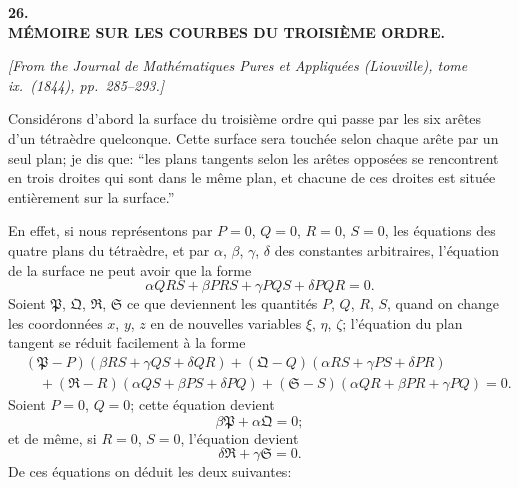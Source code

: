 \documentclass[12pt,a4paper]{article}
\providecommand{\fS}{\mathfrak{S}}
\providecommand{\fP}{\mathfrak{P}}
\providecommand{\fQ}{\mathfrak{Q}}
\providecommand{\fR}{\mathfrak{R}}
\begin{document}
\newpage
\setcounter{page}{183}

\begin{center}
\textbf{\Large 26.}\\[1em]
\textbf{\Large M\'EMOIRE SUR LES COURBES DU TROISI\`EME ORDRE.}
\end{center}

\textit{[From the Journal de Math\'ematiques Pures et Appliqu\'ees (Liouville), tome ix.~(1844), pp.~285--293.]}

\bigskip

Consid\'erons d'abord la surface du troisi\`eme ordre qui passe par les six ar\^etes d'un t\'etra\`edre quelconque. Cette surface sera touch\'ee selon chaque ar\^ete par un seul plan; je dis que: ``les plans tangents selon les ar\^etes oppos\'ees se rencontrent en trois droites qui sont dans le m\^eme plan, et chacune de ces droites est situ\'ee enti\`erement sur la surface.''

En effet, si nous repr\'esentons par $P = 0$, $Q = 0$, $R = 0$, $S = 0$, les \'equations des quatre plans du t\'etra\`edre, et par $\alpha$, $\beta$, $\gamma$, $\delta$ des constantes arbitraires, l'\'equation de la surface ne peut avoir que la forme
\[
\alpha QRS + \beta PRS + \gamma PQS + \delta PQR = 0.
\]
Soient $\fP$, $\fQ$, $\fR$, $\fS$ ce que deviennent les quantit\'es $P$, $Q$, $R$, $S$, quand on change les coordonn\'ees $x$, $y$, $z$ en de nouvelles variables $\xi$, $\eta$, $\zeta$; l'\'equation du plan tangent se r\'eduit facilement \`a la forme
\begin{align*}
&(\fP - P)(\beta RS + \gamma QS + \delta QR) + (\fQ - Q)(\alpha RS + \gamma PS + \delta PR)\\
&\quad + (\fR - R)(\alpha QS + \beta PS + \delta PQ) + (\fS - S)(\alpha QR + \beta PR + \gamma PQ) = 0.
\end{align*}
Soient $P = 0$, $Q = 0$; cette \'equation devient
\[
\beta\fP + \alpha\fQ = 0;
\]
et de m\^eme, si $R = 0$, $S = 0$, l'\'equation devient
\[
\delta\fR + \gamma\fS = 0.
\]
De ces \'equations on d\'eduit les deux suivantes:

\newpage
\setcounter{page}{184}
\end{document}
